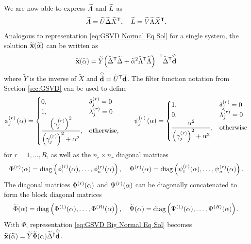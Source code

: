 \documentclass[12pt]{article}
\begin{document}
\noindent We are now able to express $\widetilde{A}$ and $\widetilde{L}$ as
\begin{equation}
    \label{eq:Adapted A and L GSVD}
    \widetilde{A} = \widetilde{U}\widetilde{\Delta}{\widetilde{X}}^\mathsf{T}, \quad \widetilde{L} = \widetilde{V}\widetilde{\Lambda}{\widetilde{X}}^\mathsf{T}.
\end{equation}
Analogous to representation \eqref{eq:GSVD Normal Eq Sol} for a single system, the solution $\widetilde{\mathbf{x}}(\widetilde{\alpha})$ can be written as 
\begin{equation}
    \label{eq:GSVD Big Normal Eq Sol}
    \widetilde{\mathbf{x}}(\widetilde{\alpha}) = \widetilde{Y}{\left({\widetilde{\Delta}}^\mathsf{T}\widetilde{\Delta} + \widetilde{\alpha}^2 {\widetilde{\Lambda}}^\mathsf{T}\widetilde{\Lambda}\right)}^{-1}{\widetilde{\Delta}}^\mathsf{T}\widehat{\widetilde{\mathbf{d}}}
\end{equation}
where $\widetilde{Y}$ is the inverse of $\widetilde{X}$ and $\widehat{\widetilde{\mathbf{d}}} = {\widetilde{U}}^\mathsf{T}\widetilde{\mathbf{d}}$. The filter function notation from Section \ref{sec:GSVD} can be used to define
\[\phi_j^{(r)}\left(\alpha\right) = \begin{cases}
0, & \delta_j^{(r)} = 0 \\
1, & \lambda_j^{(r)} = 0 \\
\dfrac{\left(\gamma_j^{(r)}\right)^2}{\left(\gamma_j^{(r)}\right)^2 + \alpha^2}, & \text{otherwise,}
\end{cases} \qquad
\psi_j^{(r)}\left(\alpha\right) = \begin{cases}
1, & \delta_j^{(r)} = 0 \\
0, & \lambda_j^{(r)} = 0 \\
\dfrac{\alpha^2}{\left(\gamma_j^{(r)}\right)^2 + \alpha^2}, & \text{otherwise}
\end{cases}\]
for $r = 1,\ldots,R$, as well as the $n_r \times n_r$ diagonal matrices
\[\Phi^{(r)}(\alpha) = \operatorname{diag}\left(\phi_1^{(r)}(\alpha),\ldots,\phi_n^{(r)}(\alpha)\right), \quad \Psi^{(r)}(\alpha) = \operatorname{diag}\left(\psi_1^{(r)}(\alpha),\ldots,\psi_n^{(r)}(\alpha)\right).\]
The diagonal matrices $\Phi^{(r)}(\alpha)$ and $\Psi^{(r)}(\alpha)$ can be diagonally concatenated to form the block diagonal matrices
\[\widetilde{\Phi}(\alpha) = \operatorname{diag}\left(\Phi^{(1)}(\alpha),\ldots,\Phi^{(R)}(\alpha)\right), \quad \widetilde{\Psi}(\alpha) = \operatorname{diag}\left(\Psi^{(1)}(\alpha),\ldots,\Psi^{(R)}(\alpha)\right).\]
With $\widetilde{\Phi}$, representation \eqref{eq:GSVD Big Normal Eq Sol} becomes $\widetilde{\mathbf{x}}(\widetilde{\alpha}) = \widetilde{Y}\widetilde{\Phi}(\alpha){\widetilde{\Delta}}^\dagger\widehat{\widetilde{\mathbf{d}}}$.
\end{document}
